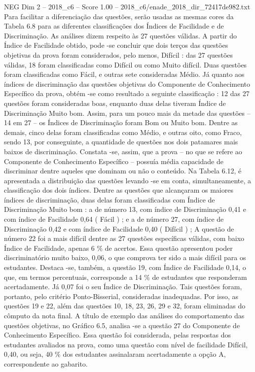 \begin{textsample}{NEG Dim 2 – 2018\_c6 – Score 1.00 – 2018\_c6/enade\_2018\_dir\_72417de982.txt}
Para facilitar a diferenciação das questões, serão usadas as mesmas cores da Tabela 6.8 para as diferentes classificações dos Índices de Facilidade e de Discriminação.
As análises dizem respeito às 27 questões válidas.
A partir do Índice de Facilidade obtido, pode -se concluir que dois terços das questões objetivas da prova foram considerados, pelo menos, Difícil : das 27 questões válidas, 18 foram classificadas como Difícil ou como Muito difícil.
Duas questões foram classificadas como Fácil, e outras sete consideradas Médio.
Já quanto aos índices de discriminação das questões objetivas do Componente de Conhecimento Específico da prova, obtém -se como resultado a seguinte classificação : 12 das 27 questões foram consideradas boas, enquanto duas delas tiveram Índice de Discriminação Muito bom.
Assim, para um pouco mais da metade das questões – 14 em 27 – os Índices de Discriminação foram Bom ou Muito bom.
Dentre as demais, cinco delas foram classificadas como Médio, e outras oito, como Fraco, sendo 13, por conseguinte, a quantidade de questões nos dois patamares mais baixos de discriminação.
Constata -se, assim, que a prova – no que se refere ao Componente de Conhecimento Específico – possuía média capacidade de discriminar dentre aqueles que dominam ou não o conteúdo.
Na Tabela 6.12, é apresentada a distribuição das questões levando -se em conta, simultaneamente, a classificação dos dois índices.
Dentre as questões que alcançaram os maiores índices de discriminação, duas delas foram classificadas com Índice de Discriminação Muito bom : a de número 13, com índice de Discriminação 0,41 e com índice de Facilidade 0,64 ( Fácil ) ; e a de número 27, com índice de Discriminação 0,42 e com índice de Facilidade 0,40 ( Difícil ) ; A questão de número 22 foi a mais difícil dentre as 27 questões específicas válidas, com baixo Índice de Facilidade, apenas 6 \% de acertos.
Essa questão apresentou poder discriminatório muito baixo, 0,06, o que comprova ter sido a mais difícil para os estudantes.
Destaca -se, também, a questão 19, com Índice de Facilidade 0,14, o que, em termos percentuais, corresponde a 14 \% de estudantes que responderam acertadamente.
Já 0,07 foi o seu Índice de Discriminação.
Tais questões foram, portanto, pelo critério Ponto-Bisserial, consideradas inadequadas.
Por isso, as questões 19 e 22, além das questões 10, 18, 23, 26, 29 e 32, foram eliminadas do cômputo da nota final.
A título de exemplo das análises do comportamento das questões objetivas, no Gráfico 6.5, analisa -se a questão 27 do Componente de Conhecimento Específico.
Essa questão foi considerada, pelas respostas dos estudantes avaliados na prova, como uma questão com nível de facilidade Difícil, 0,40, ou seja, 40 \% dos estudantes assinalaram acertadamente a opção A, correspondente ao gabarito.

\end{textsample}
